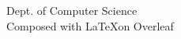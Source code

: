 \begin{titlepage}

\vfill %

Dept. of Computer Science \\ %
Composed with \LaTeX  on Overleaf

\vfill %


\vfill %
	
\end{titlepage}
